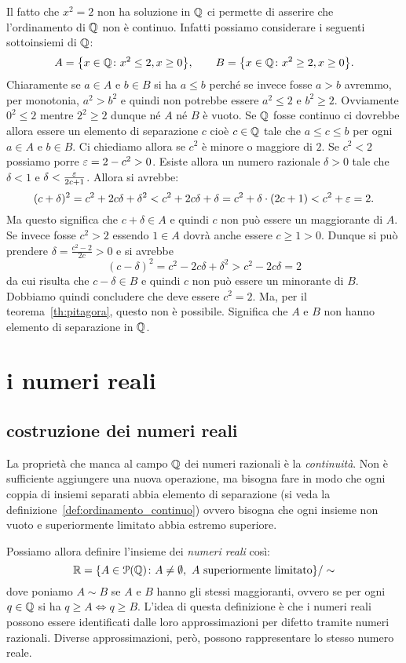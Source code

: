 Il fatto che $x^2=2$ non ha soluzione in ${\mathbb Q}$ ci permette di 
asserire che l'ordinamento di ${\mathbb Q}$ non è continuo.
%
Infatti possiamo considerare i seguenti sottoinsiemi di ${\mathbb Q}$:
\[
 A = {\left\{ x\in {\mathbb Q}\colon x^2\le 2, x\ge 0 \right\}}, \qquad
 B = {\left\{ x\in {\mathbb Q}\colon x^2\ge 2, x\ge 0 \right\}}. 
\]
Chiaramente se $a\in A$ e $b\in B$ si ha $a\le b$ perché se 
invece fosse $a>b$ avremmo, per monotonia, $a^2>b^2$ 
e quindi non potrebbe essere $a^2 \le 2$ e $b^2\ge 2$.
Ovviamente $0^2 \le 2$ mentre $2^2\ge 2$ dunque né $A$ né $B$ 
è vuoto.
Se ${\mathbb Q}$ fosse continuo ci dovrebbe allora essere un elemento di 
separazione $c$ cioè $c\in {\mathbb Q}$ tale che $a\le c\le b$ per ogni 
$a\in A$ e $b\in B$.
Ci chiediamo allora se $c^2$ è minore o maggiore di $2$.
Se $c^2<2$ possiamo porre $\varepsilon = 2-c^2 > 0$. 
Esiste allora 
un numero razionale $\delta>0$ tale che $\delta<1$ 
e $\delta < \frac{\varepsilon}{2c+1}$.
Allora si avrebbe:
\[
 (c+\delta)^2 
  = c^2+2c\delta + \delta^2 
  < c^2 + 2c\delta + \delta 
  = c^2 + \delta\cdot(2c+1) 
  < c^2 + \varepsilon = 2.
\]
Ma questo significa che $c+\delta \in A$ e quindi $c$ non può essere 
un maggiorante di $A$.
Se invece fosse $c^2>2$ 
essendo $1\in A$ dovrà anche essere $c\ge 1>0$.
Dunque si può prendere $\delta = \frac{c^2-2}{2c}>0$
e si avrebbe 
\[
 (c-\delta)^2 
 = c^2 - 2c\delta + \delta^2
 > c^2 - 2c\delta = 2
\]
da cui risulta che $c-\delta \in B$ e quindi $c$ non può essere
un minorante di $B$.
Dobbiamo quindi concludere che deve essere $c^2=2$.
Ma, per il teorema~\ref{th:pitagora}, questo non è possibile.
Significa che $A$ e $B$ non hanno elemento di separazione in ${\mathbb Q}$.

\section{i numeri reali}
\subsection{costruzione dei numeri reali}
\label{sec:costruzione_reali}

La proprietà che manca al campo ${\mathbb Q}$ dei numeri razionali 
è la \emph{continuità}. 
Non è sufficiente aggiungere una nuova operazione, ma bisogna 
fare in modo che ogni coppia di insiemi separati 
abbia elemento di separazione 
(si veda la definizione~\ref{def:ordinamento_continuo})
ovvero bisogna che ogni insieme non vuoto e superiormente 
limitato abbia estremo superiore.

Possiamo allora definire l'insieme dei \emph{numeri reali}
così:
%
%
%
\[
{\mathbb R} = {\left\{ A \in \mathcal P({\mathbb Q})\colon A\neq \emptyset, \text{ $A$ superiormente 
limitato} \right\}}/\sim
\]
dove poniamo $A\sim B$ 
se $A$ e $B$ hanno gli stessi maggioranti, ovvero
se per ogni $q\in {\mathbb Q}$ si ha $q\ge A \iff q\ge B$.
L'idea di questa definizione è che i numeri reali 
possono essere identificati dalle loro approssimazioni 
per difetto tramite numeri razionali. 
Diverse approssimazioni, però, possono rappresentare 
lo stesso numero reale.

